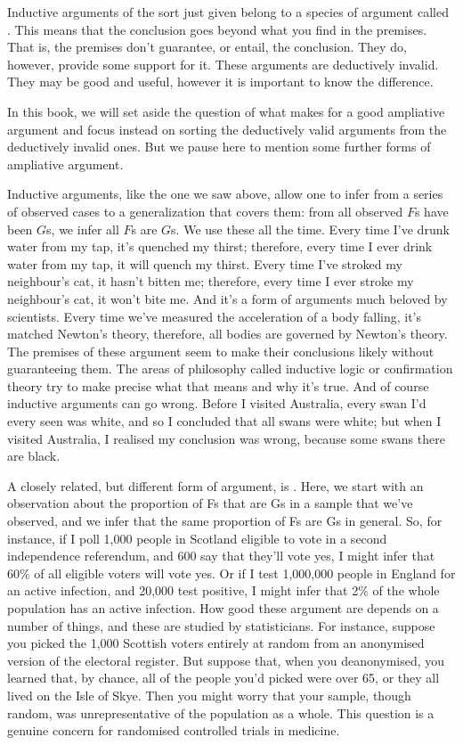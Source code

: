 Inductive arguments of the sort just given belong to a species of argument called . This means that the conclusion goes beyond what you find in the premises. That is, the premises don't guarantee, or entail, the conclusion. They do, however, provide some support for it. These arguments are deductively invalid. They may be good and useful, however it is important to know the difference. 

In this book, we will set aside the question of what makes for a good ampliative argument and focus instead on sorting the deductively valid arguments from the deductively invalid ones. 
But we pause here to mention some further forms of ampliative argument.

Inductive arguments, like the one we saw above, allow one to infer from a series of observed cases to a generalization that covers them: from all observed $F$s have been $G$s, we infer all $F$s are $G$s. We use these all the time. Every time I've drunk water from my tap, it's quenched my thirst; therefore, every time I ever drink water from my tap, it will quench my thirst. Every time I've stroked my neighbour's cat, it hasn't bitten me; therefore, every time I ever stroke my neighbour's cat, it won't bite me. And it's a form of arguments much beloved by scientists. Every time we've measured the acceleration of a body falling, it's matched Newton's theory, therefore, all bodies are governed by Newton's theory. The premises of these argument seem to make their conclusions likely without guaranteeing them. The areas of philosophy called inductive logic or confirmation theory try to make precise what that means and why it's true. And of course inductive arguments can go wrong. Before I visited Australia, every swan I'd every seen was white, and so I concluded that all swans were white; but when I visited Australia, I realised my conclusion was wrong, because some swans there are black.

A closely related, but different form of argument, is . Here, we start with an observation about the proportion of Fs that are Gs in a sample that we've observed, and we infer that the same proportion of Fs are Gs in general. So, for instance, if I poll 1,000 people in Scotland eligible to vote in a second independence referendum, and 600 say that they'll vote yes, I might infer that 60\% of all eligible voters will vote yes. Or if I test 1,000,000 people in England for an active infection, and 20,000 test positive, I might infer that 2\% of the whole population has an active infection. How good these argument are depends on a number of things, and these are studied by statisticians. For instance, suppose you picked the 1,000 Scottish voters entirely at random from an anonymised version of the electoral register. But suppose that, when you deanonymised, you learned that, by chance, all of the people you'd picked were over 65, or they all lived on the Isle of Skye. Then you might worry that your sample, though random, was unrepresentative of the population as a whole. This question is a genuine concern for randomised controlled trials in medicine.


